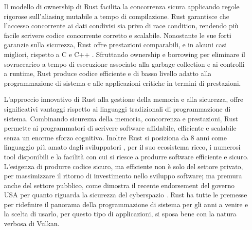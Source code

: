 Il modello di ownership di Rust facilita la concorrenza sicura applicando regole rigorose sull'aliasing mutabile a tempo di compilazione. Rust garantisce che l'accesso concorrente ai dati condivisi sia privo di race condition, rendendo più facile scrivere codice concorrente corretto e scalabile.
Nonostante le sue forti garanzie sulla sicurezza, Rust offre prestazioni comparabili, e in alcuni casi migliori, rispetto a C e C++ \cite[]{Rust:bench}. Sfruttando ownership e borrowing per eliminare il sovraccarico a tempo di esecuzione associato alla garbage collection e ai controlli a runtime, Rust produce codice efficiente e di basso livello adatto alla programmazione di sistema e alle applicazioni critiche in termini di prestazioni.

L'approccio innovativo di Rust alla gestione della memoria e alla sicurezza, offre significativi vantaggi rispetto ai linguaggi tradizionali di programmazione di sistema. Combinando sicurezza della memoria, concorrenza e prestazioni, Rust permette ai programmatori di scrivere software affidabile, efficiente e scalabile senza un enorme sforzo cognitivo. Inoltre Rust si posiziona da 8 anni come linguaggio più amato dagli sviluppatori \cite[]{Rust:love}, per il suo ecosistema ricco, i numerosi tool disponibili e la facilità con cui si riesce a produrre software efficiente e sicuro. L'esigenza di produrre codice sicuro, ma efficiente non è solo del settore privato, per massimizzare il ritorno di investimento nello sviluppo software; ma premura anche del settore pubblico, come dimostra il recente endorsement del governo USA per quanto riguarda la sicurezza del cyberspazio \cite[]{Gov:rust_use}. Rust ha tutte le premesse per ridefinire il panorama della programmazione di sistema per gli anni a venire e la scelta di usarlo, per questo tipo di applicazioni, si sposa bene con la natura verbosa di Vulkan. 